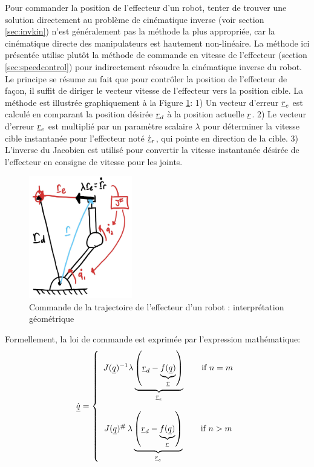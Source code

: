 Pour commander la position de l'effecteur d'un robot, tenter de trouver une solution directement au problème de cinématique inverse (voir section \ref{sec:invkin}) n'est généralement pas la méthode la plus appropriée, car la cinématique directe des manipulateurs est hautement non-linéaire. La méthode ici présentée utilise plutôt la méthode de commande en vitesse de l'effecteur (section \ref{sec:speedcontrol}) pour indirectement résoudre la cinématique inverse du robot. Le principe se résume au fait que pour contrôler la position de l'effecteur de façon,
il suffit de diriger le vecteur vitesse de l'effecteur vers la position cible. La méthode est illustrée graphiquement à la Figure \ref{fig:robotspeedcontrolgeo}: 1) Un vecteur d'erreur $\underline{r}_e$ est calculé en comparant la position désirée $\underline{r}_d$ à la position actuelle $\underline{r}$. 2) Le vecteur d'erreur $\underline{r}_e$ est multiplié par un paramètre scalaire $\lambda$ pour déterminer la vitesse cible instantanée pour l'effecteur noté $\dot{\underline{r}}_r$, qui pointe en direction de la cible. 3) L'inverse du Jacobien est utilisé pour convertir la vitesse instantanée désirée de l'effecteur en consigne de vitesse pour les joints.
\begin{figure}[H]
	\centering
	\includegraphics[width=0.4\textwidth]{fig/robotspeedcontrolgeo.jpg}
	\caption{Commande de la trajectoire de l'effecteur d'un robot : interprétation géométrique}
	\label{fig:robotspeedcontrolgeo}
\end{figure}
Formellement, la loi de commande est exprimée par l'expression mathématique:
\begin{align}
	\dot{\underline{q}} = \left\{ \begin{array}{c}
								J(\underline{q})^{-1} \lambda
								\underbrace{ \left( \underline{r}_d  - \underbrace{f(\underline{q})}_{\underline{r}}  \right) }_{\underline{r}_e}
								\quad\quad \text{if $n=m$}
								\\ \\
								J(\underline{q})^{\#} \, \lambda  \underbrace{ \left( \underline{r}_d  - \underbrace{f(\underline{q})}_{\underline{r}}  \right) }_{\underline{r}_e}    \quad\quad \text{if $n>m$}
	\end{array}
	\right.
\end{align}
